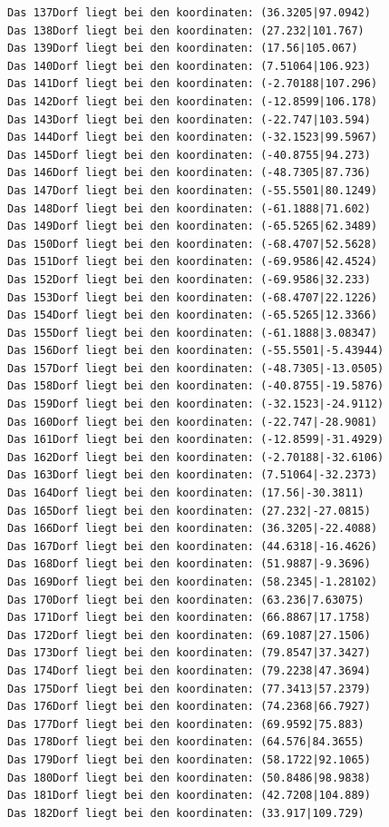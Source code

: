 \documentclass{article}
\begin{document}
\begin{verbatim}
Das 137Dorf liegt bei den koordinaten: (36.3205|97.0942)
Das 138Dorf liegt bei den koordinaten: (27.232|101.767)
Das 139Dorf liegt bei den koordinaten: (17.56|105.067)
Das 140Dorf liegt bei den koordinaten: (7.51064|106.923)
Das 141Dorf liegt bei den koordinaten: (-2.70188|107.296)
Das 142Dorf liegt bei den koordinaten: (-12.8599|106.178)
Das 143Dorf liegt bei den koordinaten: (-22.747|103.594)
Das 144Dorf liegt bei den koordinaten: (-32.1523|99.5967)
Das 145Dorf liegt bei den koordinaten: (-40.8755|94.273)
Das 146Dorf liegt bei den koordinaten: (-48.7305|87.736)
Das 147Dorf liegt bei den koordinaten: (-55.5501|80.1249)
Das 148Dorf liegt bei den koordinaten: (-61.1888|71.602)
Das 149Dorf liegt bei den koordinaten: (-65.5265|62.3489)
Das 150Dorf liegt bei den koordinaten: (-68.4707|52.5628)
Das 151Dorf liegt bei den koordinaten: (-69.9586|42.4524)
Das 152Dorf liegt bei den koordinaten: (-69.9586|32.233)
Das 153Dorf liegt bei den koordinaten: (-68.4707|22.1226)
Das 154Dorf liegt bei den koordinaten: (-65.5265|12.3366)
Das 155Dorf liegt bei den koordinaten: (-61.1888|3.08347)
Das 156Dorf liegt bei den koordinaten: (-55.5501|-5.43944)
Das 157Dorf liegt bei den koordinaten: (-48.7305|-13.0505)
Das 158Dorf liegt bei den koordinaten: (-40.8755|-19.5876)
Das 159Dorf liegt bei den koordinaten: (-32.1523|-24.9112)
Das 160Dorf liegt bei den koordinaten: (-22.747|-28.9081)
Das 161Dorf liegt bei den koordinaten: (-12.8599|-31.4929)
Das 162Dorf liegt bei den koordinaten: (-2.70188|-32.6106)
Das 163Dorf liegt bei den koordinaten: (7.51064|-32.2373)
Das 164Dorf liegt bei den koordinaten: (17.56|-30.3811)
Das 165Dorf liegt bei den koordinaten: (27.232|-27.0815)
Das 166Dorf liegt bei den koordinaten: (36.3205|-22.4088)
Das 167Dorf liegt bei den koordinaten: (44.6318|-16.4626)
Das 168Dorf liegt bei den koordinaten: (51.9887|-9.3696)
Das 169Dorf liegt bei den koordinaten: (58.2345|-1.28102)
Das 170Dorf liegt bei den koordinaten: (63.236|7.63075)
Das 171Dorf liegt bei den koordinaten: (66.8867|17.1758)
Das 172Dorf liegt bei den koordinaten: (69.1087|27.1506)
Das 173Dorf liegt bei den koordinaten: (79.8547|37.3427)
Das 174Dorf liegt bei den koordinaten: (79.2238|47.3694)
Das 175Dorf liegt bei den koordinaten: (77.3413|57.2379)
Das 176Dorf liegt bei den koordinaten: (74.2368|66.7927)
Das 177Dorf liegt bei den koordinaten: (69.9592|75.883)
Das 178Dorf liegt bei den koordinaten: (64.576|84.3655)
Das 179Dorf liegt bei den koordinaten: (58.1722|92.1065)
Das 180Dorf liegt bei den koordinaten: (50.8486|98.9838)
Das 181Dorf liegt bei den koordinaten: (42.7208|104.889)
Das 182Dorf liegt bei den koordinaten: (33.917|109.729)

\end{verbatim}
\end{document}
